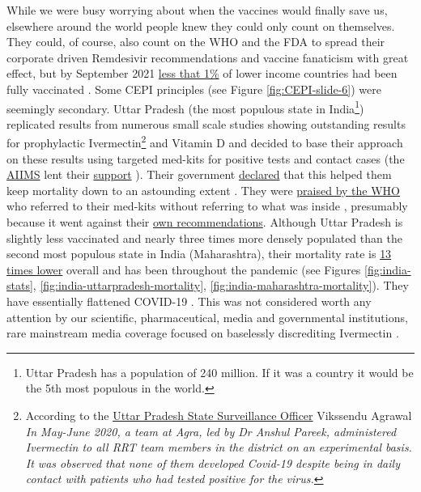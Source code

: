 \documentclass[11pt,a4paper,notitlepage]{report}
\begin{document}
While we were busy worrying about when the vaccines would finally save us, elsewhere around the world people knew they could only count on themselves. They could, of course, also count on the WHO and the FDA to spread their corporate driven Remdesivir recommendations and vaccine fanaticism with great effect, but by September 2021 \href{https://www.nature.com/articles/d41586-021-02383-z}{less that 1\%} of lower income countries had been fully vaccinated \cite{nature15092021}. Some CEPI principles (see Figure \ref{fig:CEPI-slide-6}) were seemingly secondary. Uttar Pradesh (the most populous state in India\footnote{Uttar Pradesh has a population of 240 million. If it was a country it would be the 5th most populous in the world.}) replicated results from numerous small scale studies showing outstanding results for prophylactic Ivermectin\footnote{According to the \href{https://indianexpress.com/article/cities/lucknow/uttar-pradesh-government-says-ivermectin-helped-to-keep-deaths-low-7311786/}{Uttar Pradesh State Surveillance Officer} Vikssendu Agrawal \cite{indianexpress12052021} \textit{In May-June 2020, a team at Agra, led by Dr Anshul Pareek, administered Ivermectin to all RRT team members in the district on an experimental basis. It was observed that none of them developed Covid-19 despite being in daily contact with patients who had tested positive for the virus.}} and Vitamin D and decided to base their approach on these results using targeted med-kits for positive tests and contact cases (the \href{https://www.aiims.edu/en.html}{AIIMS} lent their \href{https://www.cureus.com/articles/64807-prophylactic-role-of-ivermectin-in-severe-acute-respiratory-syndrome-coronavirus-2-infection-among-healthcare-workers}{support} \cite{Behera2021-qu}). Their government \href{https://indianexpress.com/article/cities/lucknow/uttar-pradesh-government-says-ivermectin-helped-to-keep-deaths-low-7311786/}{declared} that this helped them keep mortality down to an astounding extent \cite{indianexpress12052021}. They were \href{https://www.who.int/india/news/feature-stories/detail/uttar-pradesh-going-the-last-mile-to-stop-covid-19}{praised by the WHO} \cite{who07052021} who referred to their med-kits without referring to what was inside \cite{medicalupdateonline21052021} \cite{hindu14092020}, presumably because it went against their \href{https://www.who.int/news-room/feature-stories/detail/who-advises-that-ivermectin-only-be-used-to-treat-covid-19-within-clinical-trials}{own recommendations}. Although Uttar Pradesh is slightly less vaccinated and nearly three times more densely populated than the second most populous state in India (Maharashtra), their mortality rate is \hyperref[fig:india-stats]{13 times lower} overall and has been throughout the pandemic (see Figures \ref{fig:india-stats}, \ref{fig:india-uttarpradesh-mortality}, \ref{fig:india-maharashtra-mortality}). They have essentially flattened COVID-19 \cite{hindustantimes19092021}. This was not considered worth any attention by our scientific, pharmaceutical, media and governmental institutions, rare mainstream media coverage focused on baselessly discrediting Ivermectin \cite{torontoStar28012022}.
\end{document}
